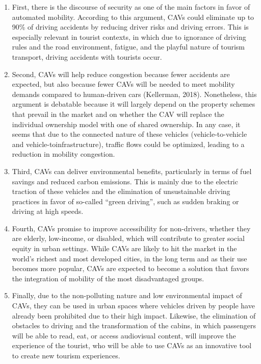\documentclass[
  letterpaper,
  DIV=11,
  numbers=noendperiod]{scrreprt}
\begin{document}
\begin{enumerate}
\def\labelenumi{\arabic{enumi}.}
\item
  First, there is the discourse of security as one of the main factors
  in favor of automated mobility. According to this argument, CAVs could
  eliminate up to 90\% of driving accidents by reducing driver risks and
  driving errors. This is especially relevant in tourist contexts, in
  which due to ignorance of driving rules and the road environment,
  fatigue, and the playful nature of tourism transport, driving
  accidents with tourists occur.
\item
  Second, CAVs will help reduce congestion because fewer accidents are
  expected, but also because fewer CAVs will be needed to meet mobility
  demands compared to human-driven cars (Kellerman, 2018). Nonetheless,
  this argument is debatable because it will largely depend on the
  property schemes that prevail in the market and on whether the CAV
  will replace the individual ownership model with one of shared
  ownership. In any case, it seems that due to the connected nature of
  these vehicles (vehicle-to-vehicle and vehicle-toinfrastructure),
  traffic flows could be optimized, leading to a reduction in mobility
  congestion.
\item
  Third, CAVs can deliver environmental benefits, particularly in terms
  of fuel savings and reduced carbon emissions. This is mainly due to
  the electric traction of these vehicles and the elimination of
  unsustainable driving practices in favor of so-called ``green
  driving'', such as sudden braking or driving at high speeds.
\item
  Fourth, CAVs promise to improve accessibility for non-drivers, whether
  they are elderly, low-income, or disabled, which will contribute to
  greater social equity in urban settings. While CAVs are likely to hit
  the market in the world's richest and most developed cities, in the
  long term and as their use becomes more popular, CAVs are expected to
  become a solution that favors the integration of mobility of the most
  disadvantaged groups.
\item
  Finally, due to the non-polluting nature and low environmental impact
  of CAVs, they can be used in urban spaces where vehicles driven by
  people have already been prohibited due to their high impact.
  Likewise, the elimination of obstacles to driving and the
  transformation of the cabins, in which passengers will be able to
  read, eat, or access audiovisual content, will improve the experience
  of the tourist, who will be able to use CAVs as an innovative tool to
  create new tourism experiences.
\end{enumerate}
\end{document}
